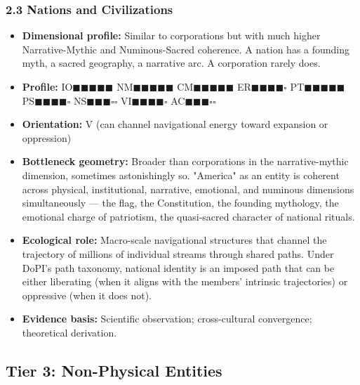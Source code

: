 \subsubsection*{2.3 Nations and Civilizations}

\begin{itemize}[nosep,leftmargin=*]
  \item \textbf{Dimensional profile:} Similar to corporations but with much higher Narrative-Mythic and Numinous-Sacred coherence. A nation has a founding myth, a sacred geography, a narrative arc. A corporation rarely does.
  \item \textbf{Profile:} IO$\blacksquare$$\blacksquare$$\blacksquare$$\blacksquare$$\blacksquare$ NM$\blacksquare$$\blacksquare$$\blacksquare$$\blacksquare$$\blacksquare$ CM$\blacksquare$$\blacksquare$$\blacksquare$$\blacksquare$$\blacksquare$ ER$\blacksquare$$\blacksquare$$\blacksquare$$\blacksquare$$\square$ PT$\blacksquare$$\blacksquare$$\blacksquare$$\blacksquare$$\blacksquare$ PS$\blacksquare$$\blacksquare$$\blacksquare$$\blacksquare$$\square$ NS$\blacksquare$$\blacksquare$$\blacksquare$$\square$$\square$ VI$\blacksquare$$\blacksquare$$\blacksquare$$\blacksquare$$\square$ AC$\blacksquare$$\blacksquare$$\blacksquare$$\square$$\square$
  \item \textbf{Orientation:} V (can channel navigational energy toward expansion or oppression)
  \item \textbf{Bottleneck geometry:} Broader than corporations in the narrative-mythic dimension, sometimes astonishingly so. "America" as an entity is coherent across physical, institutional, narrative, emotional, and numinous dimensions simultaneously — the flag, the Constitution, the founding mythology, the emotional charge of patriotism, the quasi-sacred character of national rituals.
  \item \textbf{Ecological role:} Macro-scale navigational structures that channel the trajectory of millions of individual streams through shared paths. Under DoPI's path taxonomy, national identity is an imposed path that can be either liberating (when it aligns with the members' intrinsic trajectories) or oppressive (when it does not).
  \item \textbf{Evidence basis:} Scientific observation; cross-cultural convergence; theoretical derivation.
\end{itemize}


\bigskip\noindent\makebox[\textwidth]{\color{rulegray}\rule{5cm}{0.3pt}}\bigskip


\subsection*{Tier 3: Non-Physical Entities}


